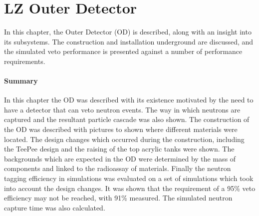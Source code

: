 \chapter{LZ Outer Detector}
\label{chapter:lz_outer_detector}
\par
In this chapter, the Outer Detector (OD) is described, along with an insight into its subsystems.
The construction and installation underground are discussed, and the simulated veto performance is presented against a number of performance requirements.




\clearpage

\clearpage


\subsubsection*{Summary}

\par
In this chapter the OD was described with its existence motivated by the need to have a detector that can veto neutron events.
The way in which neutrons are captured and the resultant particle cascade was also shown.
The construction of the OD was described with pictures to shown where different materials were located.
The design changes which occurred during the construction, including the TeePee design and the raising of the top acrylic tanks were shown.
The backgrounds which are expected in the OD were determined by the mass of components and linked to the radioassay of materials.
Finally the neutron tagging efficiency in simulations was evaluated on a set of simulations which took into account the design changes.
It was shown that the requirement of a 95\% veto efficiency may not be reached, with 91\% measured.
The simulated neutron capture time was also calculated.